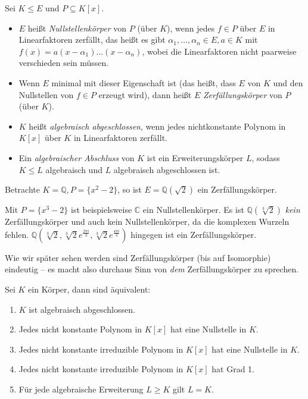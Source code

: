 \begin{definition}
    Sei $K \leq E$ und $P \subseteq K[x]$.
    \begin{itemize}
        \item $E$ heißt \emph{Nullstellenkörper} von $P$ (über $K$), wenn jedes $f \in P$ über $E$ in Linearfaktoren zerfällt, das heißt es gibt $\alpha_1, \hdots, \alpha_n \in E, a \in K$ mit $f(x) = a(x - \alpha_1) \hdots (x - \alpha_n)$, wobei die Linearfaktoren nicht paarweise verschieden sein müssen.
        \item Wenn $E$ minimal mit dieser Eigenschaft ist (das heißt, dass $E$ von $K$ und den Nullstellen von $f \in P$ erzeugt wird), dann heißt $E$ \emph{Zerfällungskörper} von $P$ (über $K$).
        \item $K$ heißt \emph{algebraisch abgeschlossen}, wenn jedes nichtkonstante Polynom in $K[x]$ über $K$ in Linearfaktoren zerfällt.
        \item Ein \emph{algebraischer Abschluss} von $K$ ist ein Erweiterungskörper $L$, sodass $K \leq L$ algebraisch und $L$ algebraisch abgeschlossen ist.
    \end{itemize}
\end{definition}

\begin{example}
    Betrachte $K = \mathbb{Q}, P = \{ x^2 - 2 \}$, so ist $E = \mathbb{Q}(\sqrt{2})$ ein Zerfällungskörper.
    
    Mit $P = \{ x^3 - 2 \}$ ist beispielsweise $\mathbb{C}$ ein Nullstellenkörper. Es ist $\mathbb{Q}(\sqrt[3]{2})$ \emph{kein} Zerfällungskörper und auch kein Nullstellenkörper, da die komplexen Wurzeln fehlen. $\mathbb{Q}(\sqrt[3]{2}, \sqrt[3]{2} e^{\frac{2 \pi i}{3}}, \sqrt[3]{2} e^{\frac{4 \pi i}{3}})$ hingegen ist ein Zerfällungskörper.
\end{example}

\begin{remark}
    Wie wir später sehen werden sind Zerfällungskörper (bis auf Isomorphie) eindeutig -- es macht also durchaus Sinn von \emph{dem} Zerfällungskörper zu sprechen.
\end{remark}

\begin{proposition}
    Sei $K$ ein Körper, dann sind äquivalent:
    \begin{enumerate}
        \item $K$ ist algebraisch abgeschlossen.
        \item Jedes nicht konstante Polynom in $K[x]$ hat eine Nullstelle in $K$.
        \item Jedes nicht konstante irreduzible Polynom in $K[x]$ hat eine Nullstelle in $K$.
        \item Jedes nicht konstante irreduzible Polynom in $K[x]$ hat Grad 1.
        \item Für jede algebraische Erweiterung $L \geq K$ gilt $L = K$.
    \end{enumerate}
\end{proposition}

